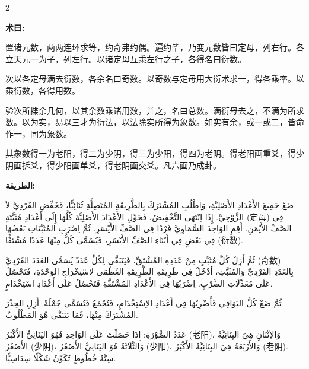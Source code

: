 \documentclass[11pt,a4paper]{article}
\newcommand{\ar}[1]{\arabicfont\beginR #1\endR}
\newenvironment{bilingual}{%
  \begin{paracol}{2}
}{%
  \end{paracol}
}
\newcommand{\cnlabel}[1]{\textcolor{algocolor}{\textbf{#1}}}
\newcommand{\arlabel}[1]{\ar{\textcolor{algocolor}{\textbf{#1}}}}
\begin{document}
\begin{bilingual}

\begin{leftcolumn*}
\cnlabel{术曰:}

置诸元数，两两连环求等，约奇弗约偶。遍约毕，乃变元数皆曰定母，列右行。各立天元一为子，列左行。以诸定母互乘左行之子，各得名曰衍数。

次以各定母满去衍数，各余名曰奇数。以奇数与定母用大衍术求一，得各乘率。以乘衍数，各得用数。

验次所揲余几何，以其余数乘诸用数，并之，名曰总数。满衍母去之，不满为所求数。以为实，易以三才为衍法，以法除实所得为象数。如实有余，或一或二，皆命作一，同为象数。

其象数得一为老阳，得二为少阴，得三为少阳，得四为老阴。得老阳画重爻，得少阴画拆爻，得少阳画单爻，得老阴画交爻。凡六画乃成卦。
\end{leftcolumn*}

\begin{rightcolumn*}
\arlabel{الطريقة:}

\ar{ضَعْ جَمِيعَ الأَعْدَادِ الأَصْلِيَّةِ، وَاطْلُبِ المُشْتَرَكَ بِالطَّرِيقَةِ المُتَصِلَّةِ ثُنَائِيًّا، فَخَفِّضِ الفَرْدِيَّ لاَ الزَّوْجِيَّ. إِذَا اِنْتَهَى التَّخْفِيضُ، فَحَوِّلِ الأَعْدَادَ الأَصْلِيَّةَ كُلَّهَا إِلَى أَعْدَادٍ مُثَبَّتَةٍ (定母) فِي الصَّفِّ الأَيْمَنِ. أَقِمِ الوَاحِدَ السَّمَاوِيَّ فَرْدًا فِي الصَّفِّ الأَيْسَرِ. ثُمَّ اِضْرَبِ المُثَبَّتَاتِ بَعْضُهَا فِي بَعْضٍ فِي أَبْنَاءِ الصَّفِّ الأَيْسَرِ، فَيُسَمَّى كُلٌّ مِنْهَا عَدَدًا مُشْتَقًّا (衍数).}

\ar{ثُمَّ أَزِلْ كُلَّ مُثَبَّتٍ مِنْ عَدَدِهِ المُشْتَقِّ، فَيَتَبَقَّى لِكُلٍّ عَدَدٌ يُسَمَّى العَدَدَ الفَرْدِيَّ (奇数). بِالعَدَدِ الفَرْدِيِّ وَالمُثَبَّتِ، اُدْخُلْ فِي طَرِيقَةِ الطَّرِيقَةِ العُظْمَى لاسْتِخْرَاجِ الوَحْدَةِ، فَتَحْصُلُ عَلَى مُعَدِّلَاتِ الضَّرْبِ. اِضْرَبْهَا فِي الأَعْدَادِ المُشْتَقَّةِ فَتَحْصُلُ عَلَى أَعْدَادِ اسْتِخْدَامٍ.}

\ar{ثُمَّ ضَعْ كُلَّ البَوَاقِي فَأَضْرِبْهَا فِي أَعْدَادِ الاِسْتِخْدَامِ، فَتُجْمَعُ فَتُسَمَّى جُمْلَةً. أَزِلِ الجِذْرَ المُشْتَرَكَ مِنْهَا، فَمَا يَتَبَقَّى هُوَ المَطْلُوبُ.}

\ar{عَدَدُ الصُّوْرَةِ: إِذَا حَصَلْتَ عَلَى الوَاحِدِ فَهُوَ اليَنَانِيُّ الأَكْبَرُ (老阳)، وَالاِثْنَانِ هِيَ اليِنَانِيَّةُ الأَصْغَرُ (少阴)، وَالثَّلَاثَةُ هُوَ اليَنَانِيُّ الأَصْغَرُ (少阳)، وَالأَرْبَعَةُ هِيَ اليِنَانِيَّةُ الأَكْبَرُ (老阴). سِتَّةُ خُطُوطٍ تُكَوِّنُ شَكْلًا سِدَاسِيًّا.}
\end{rightcolumn*}

\end{bilingual}
\end{document}
